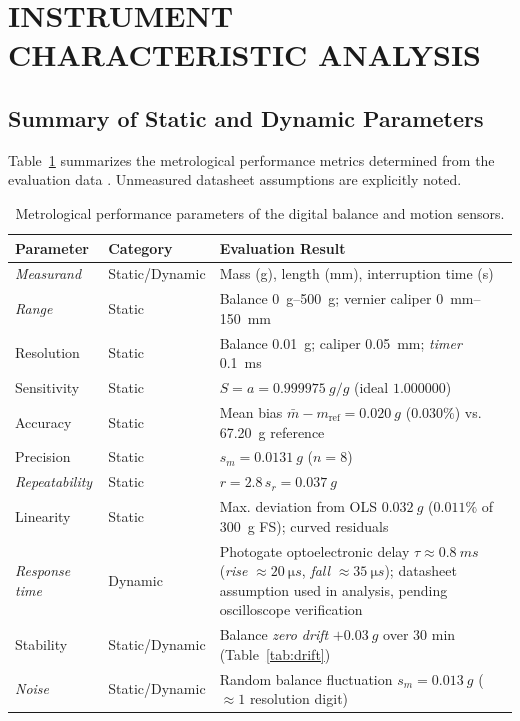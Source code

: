 \documentclass[a4paper, 12pt]{article}
\begin{document}
\section{INSTRUMENT CHARACTERISTIC ANALYSIS}
        \subsection{Summary of Static and Dynamic Parameters}
        Table~\ref{tab:param} summarizes the metrological performance metrics determined from the evaluation data \parencite{JCGM2012VIM,MorrisLangari}. Unmeasured datasheet assumptions are explicitly noted.
\begin{table}[H]
\centering
\singlespacing
\caption{Metrological performance parameters of the digital balance and motion sensors.}
\label{tab:param}
\small
\begin{tabularx}{\textwidth}{@{}l l X@{}}
\toprule
\textbf{Parameter} & \textbf{Category} & \textbf{Evaluation Result}\\
\midrule
\textit{Measurand} & Static/Dynamic & Mass (g), length (mm), interruption time (s)\\
\textit{Range} & Static & Balance \SIrange{0}{500}{g}; vernier caliper \SIrange{0}{150}{mm}\\
Resolution & Static & Balance \SI{0.01}{g}; caliper \SI{0.05}{mm}; \textit{timer} \SI{0.1}{ms}\\
Sensitivity & Static & $S=a=0.999975\ \si{g/g}$ (ideal $1.000000$)\\
Accuracy & Static & Mean bias $\bar{m}-m_{\mathrm{ref}}=\SI{0.020}{g}$ ($0.030\%$) vs. \SI{67.20}{g} reference\\
Precision & Static & $s_m=\SI{0.0131}{g}$ ($n=8$)\\
\textit{Repeatability} & Static & $r=2.8\,s_r=\SI{0.037}{g}$\\
Linearity & Static & Max. deviation from OLS $\SI{0.032}{g}$ ($0.011\%$ of \SI{300}{g} FS); curved residuals\\
\textit{Response time} & Dynamic & Photogate optoelectronic delay $\tau\approx\SI{0.8}{ms}$ (\textit{rise} $\approx\SI{20}{\micro s}$, \textit{fall} $\approx\SI{35}{\micro s}$); datasheet assumption used in analysis, pending oscilloscope verification\\
Stability & Static/Dynamic & Balance \textit{zero drift} $+\SI{0.03}{g}$ over $30$ min (Table~\ref{tab:drift})\\
\textit{Noise} & Static/Dynamic & Random balance fluctuation $s_m=\SI{0.013}{g}$ ($\approx 1$ resolution digit)\\
\bottomrule
\end{tabularx}
\end{table}
\end{document}
